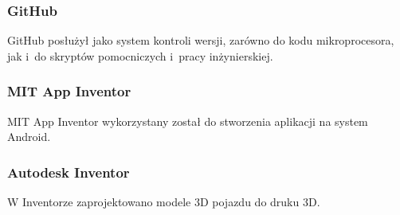 \subsubsection*{GitHub}
GitHub posłużył jako system kontroli wersji, zarówno do kodu mikroprocesora, jak i~do skryptów pomocniczych i~pracy inżynierskiej.

\subsubsection*{MIT App Inventor}
MIT App Inventor wykorzystany został do stworzenia aplikacji na system Android.

\subsubsection*{Autodesk Inventor}
W Inventorze zaprojektowano modele 3D pojazdu do druku 3D.